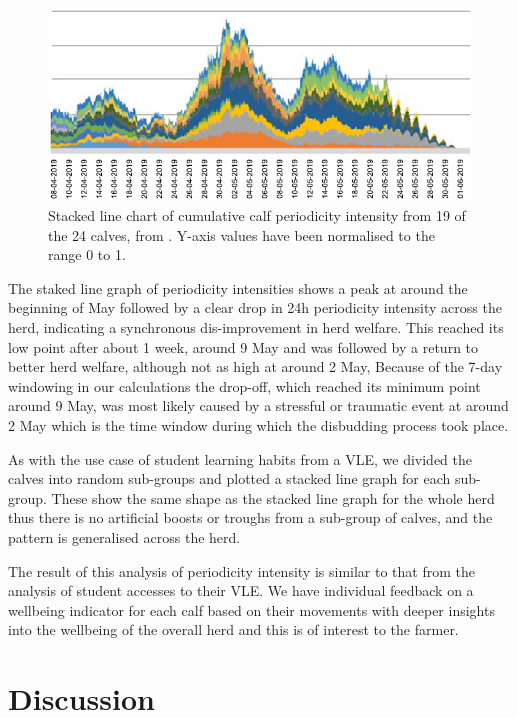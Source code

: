 \documentclass[preprints,article,accept,pdftex,moreauthors]{Definitions/mdpi}
\begin{document}
{\begin{figure}[H]
\centering
\includegraphics[width=\linewidth,height=0.3\textheight]{Stacked-calves.png}
\caption{Stacked line chart of cumulative calf periodicity intensity from 19 of the 24 calves, from \cite{rhodes2022periodicity}. {Y-axis values have been normalised to the range 0 to 1.}\label{fig:All-calves}}
\end{figure}   

The staked line graph of periodicity intensities shows a  peak at around the beginning of May followed by a clear drop in 24h periodicity intensity across the herd, indicating a synchronous dis-improvement in herd welfare. This reached its low point after about 1 week, around 9 May and was followed by a return to better herd welfare, although not as high  at {around} 2 May,  Because of the 7-day windowing in our calculations the drop-off, which reached its minimum point around 9 May, was most likely caused by a stressful or traumatic event at around 2 May which is the time window during which the disbudding process took place.

As with the use case of student learning habits from a VLE, we divided the calves into random sub-groups and plotted a stacked line graph for each sub-group. These show the same shape as the stacked line graph for the whole herd thus there is no artificial boosts or troughs from a sub-group of calves, and the pattern is generalised across the herd.

The result of this analysis of periodicity intensity is similar to that from the analysis of student accesses to their VLE.  We have individual feedback on a wellbeing indicator for each calf based on their movements with deeper insights into the wellbeing of the overall herd and this is of interest to the farmer.



\section{Discussion}

}
\end{document}
